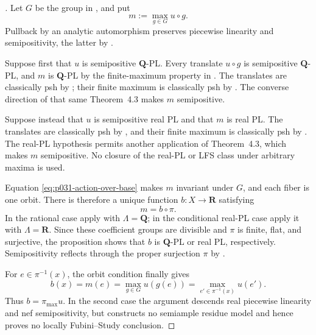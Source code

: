 
\begin{proof}[]
Let $G$ be the group in
, and put
\begin{equation}
\label{eq:p031-orbit-symmetrization}
                         m:=\max_{g\in G}u\circ g.
\end{equation}
Pullback by an analytic automorphism preserves piecewise linearity and
semipositivity, the latter by
\cite[Proposition~7.6\textup{(1')}]{GJR26}.

Suppose first that $u$ is semipositive $\mathbf Q$-PL.  Every translate
$u\circ g$ is semipositive $\mathbf Q$-PL, and $m$ is $\mathbf Q$-PL by
the finite-maximum property in \cite[\S5.2\textup{(7)}]{GJR26}.  The
translates are classically psh by
\cite[Theorem~4.3]{GR25Classical}; their finite maximum is classically psh
by \cite[Proposition~4.2\textup{(3)}]{GR25Classical}.  The converse
direction of that same Theorem~4.3 makes $m$ semipositive.

Suppose instead that $u$ is semipositive real PL and that $m$ is real PL.
The translates are classically psh by \cite[Theorem~4.3]{GR25Classical},
and their finite maximum is classically psh by
\cite[Proposition~4.2(3)]{GR25Classical}. The real-PL hypothesis permits
another application of Theorem~4.3, which makes $m$ semipositive.
No closure of the real-PL or LFS class under arbitrary maxima is used.

Equation \eqref{eq:p031-action-over-base} makes $m$ invariant under $G$,
and each fiber is one orbit.  There is therefore a unique function
$b:X\to\mathbf R$ satisfying
\begin{equation}
\label{eq:p031-orbit-symmetrization-descends}
                         m=b\circ\pi.
\end{equation}
In the rational case apply \cite[Proposition~5.11]{GJR26} with
$\Lambda=\mathbf Q$; in the conditional real-PL case apply it with
$\Lambda=\mathbf R$.  Since these coefficient groups are divisible and
$\pi$ is finite, flat, and surjective, the proposition shows that $b$ is
$\mathbf Q$-PL or real PL, respectively.  Semipositivity reflects through
the proper surjection $\pi$ by
\cite[Proposition~7.6\textup{(1')}]{GJR26}.

For $e\in\pi^{-1}(x)$, the orbit condition finally gives
\[
 b(x)=m(e)=\max_{g\in G}u(g(e))
              =\max_{e'\in\pi^{-1}(x)}u(e').
\]
Thus $b=\pi_{\max}u$.  In the second case the argument descends real
piecewise linearity and nef semipositivity, but constructs no semiample
residue model and hence proves no locally Fubini--Study conclusion.
\end{proof}

